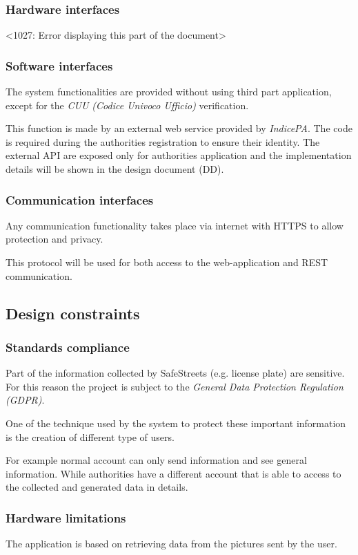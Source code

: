 \subsubsection{Hardware interfaces}
<1027: Error displaying this part of the document>

\subsubsection{Software interfaces}
The system functionalities are provided without using third part application, except for the \textit{CUU (Codice Univoco Ufficio)} verification. 

This function is made by an external web service provided by \textit{IndicePA}. The code is required during the authorities registration to ensure their identity.
The external API are exposed only for authorities application and the implementation details will be shown in the design document (DD).

\subsubsection{Communication interfaces}
Any communication functionality takes place via internet with HTTPS to allow protection and privacy.

This protocol will be used for both access to the web-application and REST communication.

\subsection{Design constraints}
\subsubsection{Standards compliance}
Part of the information collected by SafeStreets (e.g. license plate) are sensitive. For this reason the project is subject to the \textit{General Data Protection Regulation (GDPR)}. 

One of the technique used by the system to protect these important information is the creation of different type of users. 

For example normal account can only send information and see general information.
While authorities have a different account that is able to access to the collected and generated data in details.

\subsubsection{Hardware limitations}
The application is based on retrieving data from the pictures sent by the user. 

